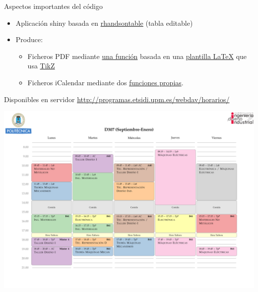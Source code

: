\documentclass[spanish, xcolor={usenames,svgnames,dvipsnames}]{beamer}
\begin{document}
\begin{frame}[label={sec:org8875b87}]{Aspectos importantes del código}
\begin{itemize}
\item Aplicación shiny basada en \href{http://jrowen.github.io/rhandsontable/}{rhandsontable} (tabla editable)
\item Produce:
\begin{itemize}
\item Ficheros PDF mediante \href{https://github.com/SOA-ETSIDI/horarios/blob/master/csv2tt.R}{una función} basada en una \href{https://github.com/SOA-ETSIDI/horarios/blob/master/timetable.tex}{plantilla \LaTeX{}} que usa \href{https://en.wikipedia.org/wiki/PGF/TikZ}{TikZ}
\item Ficheros iCalendar mediante dos \href{https://github.com/SOA-ETSIDI/misc/blob/master/funciones.R}{funciones propias}.
\end{itemize}
\end{itemize}
\end{frame}

\begin{frame}[label={sec:org36da7f1}]{Disponibles en servidor}
\url{http://programas.etsidi.upm.es/webdav/horarios/}

\begin{center}
\includegraphics[width=.9\linewidth]{images/D307_1.pdf}
\end{center}
\end{frame}
\end{document}
